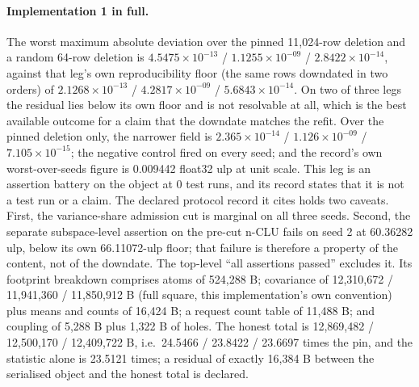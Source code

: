 \documentclass{article} %
\newcommand{\sci}[2]{\ensuremath{#1\times10^{#2}}}
\begin{document}
\paragraph{Implementation 1 in full.} The worst maximum absolute deviation over the pinned
11,024-row deletion and a random 64-row deletion is \sci{4.5475}{-13} / \sci{1.1255}{-09} /
\sci{2.8422}{-14}, against that leg's own reproducibility floor (the same rows downdated in two
orders) of \sci{2.1268}{-13} / \sci{4.2817}{-09} / \sci{5.6843}{-14}. On two of three legs the
residual lies below its own floor and is not resolvable at all, which is the best available outcome for a claim that the downdate matches the refit. Over the pinned deletion only, the narrower field is \sci{2.365}{-14} /
\sci{1.126}{-09} / \sci{7.105}{-15}; the negative control fired on every seed; and the record's
own worst-over-seeds figure is 0.009442 float32 ulp at unit scale. %
This leg is an assertion battery on the object at 0 test runs, and its record states that it is
not a test run or a claim. The declared protocol record it cites holds two caveats. First, the variance-share
admission cut is marginal on all three seeds. Second, the separate subspace-level assertion on the
pre-cut n-CLU fails on seed 2 at 60.36282 ulp, below its own 66.11072-ulp floor; that failure is
therefore a property of the content, not of the downdate. The top-level ``all assertions
passed'' excludes it. %
Its footprint breakdown comprises atoms of 524,288 B; covariance of 12,310,672 / 11,941,360 /
11,850,912 B (full square, this implementation's own convention) plus means and counts of 16,424
B; a request count table of 11,488 B; and coupling of 5,288 B plus 1,322 B of holes. The honest
total is 12,869,482 / 12,500,170 / 12,409,722 B, i.e.\ 24.5466 / 23.8422 / 23.6697 times the pin,
and the statistic alone is 23.5121 times; a residual of exactly 16,384 B between the serialised %
object and the honest total is declared. %
\end{document}
